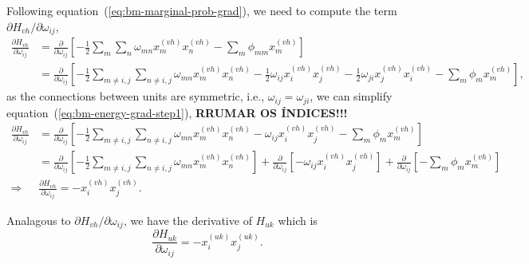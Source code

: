 Following equation~(\ref{eq:bm-marginal-prob-grad}), we need to compute the term $\partial H_{vh}/\partial \omega_{ij}$,
\begin{equation}
  \label{eq:bm-energy-grad-step1}
  \begin{split}
      \frac{\partial H_{vh}}{\partial \omega_{ij}} & = \frac{\partial}{\partial \omega_{ij}} \left[- \frac{1}{2} \sum_{m} \sum_{n} \omega_{mn} x^{(vh)}_{m} x^{(vh)}_{n} - \sum_{m} \phi_{mm} x^{(vh)}_{m} \right] \\
                                                   & = \frac{\partial}{\partial \omega_{ij}} \left[- \frac{1}{2} \sum_{m \neq i,j} \sum_{n \neq i,j} \omega_{mn} x^{(vh)}_{m} x^{(vh)}_{n} - \frac{1}{2} \omega_{ij} x^{(vh)}_{i} x^{(vh)}_{j} - \frac{1}{2} \omega_{ji} x^{(vh)}_{j} x^{(vh)}_{i} - \sum_{m} \phi_{m} x^{(vh)}_{m} \right],
  \end{split}
\end{equation}
as the connections between units are symmetric, i.e., $\omega_{ij} = \omega_{ji}$, we can simplify equation~(\ref{eq:bm-energy-grad-step1}),
\textbf{RRUMAR OS ÍNDICES!!!}
\begin{equation}
  \label{eq:bm-energy-grad-final}
  \begin{split}
    \frac{\partial H_{vh}}{\partial \omega_{ij}} & = \frac{\partial}{\partial \omega_{ij}} \left[- \frac{1}{2} \sum_{m \neq i,j} \sum_{n \neq i,j} \omega_{mn} x^{(vh)}_{m} x^{(vh)}_{n} - \omega_{ij} x^{(vh)}_{i} x^{(vh)}_{j} - \sum_{m} \phi_{m} x^{(vh)}_{m} \right] \\
    & = \frac{\partial}{\partial \omega_{ij}} \left[- \frac{1}{2} \sum_{m \neq i,j} \sum_{n \neq i,j} \omega_{mn} x^{(vh)}_{m} x^{(vh)}_{n} \right] + \frac{\partial}{\partial \omega_{ij}} \left[- \omega_{ij} x^{(vh)}_{i} x^{(vh)}_{j} \right] + \frac{\partial}{\partial \omega_{ij}} \left[- \sum_{m} \phi_{m} x^{(vh)}_{m} \right] \\
    \Rightarrow & \frac{\partial H_{vh}}{\partial \omega_{ij}} = - x^{(vh)}_{i} x^{(vh)}_{j}.
  \end{split}
\end{equation}

Analagous to $\partial H_{vh}/\partial \omega_{ij}$, we have the derivative of $H_{uk}$ which is
\begin{equation}
  \label{eq:bm-energy-grad-final2}
  \frac{\partial H_{uk}}{\partial \omega_{ij}} = - x^{(uk)}_{i} x^{(uk)}_{j}.
\end{equation}

